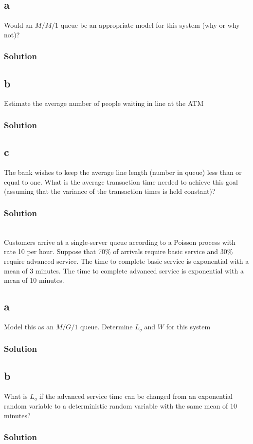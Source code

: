 \documentclass[letterpaper]{amsart}
\begin{document}
\subsection*{a}
Would an $M/M/1$ queue be an appropriate model for this system (why
or why not)?
\subsubsection*{Solution}
\subsection*{b}
Estimate the average number of people waiting in line at the ATM
\subsubsection*{Solution}
\subsection*{c}
The bank wishes to keep the average line length (number in queue) less
than or equal to one. What is the average transaction time needed to
achieve this goal (assuming that the variance of the transaction times is
held constant)?
\subsubsection*{Solution}

\section{} %
Customers arrive at a single-server queue according to a Poisson process with rate
10 per hour. Suppose that 70\% of arrivals require basic service and 30\% require
advanced service. The time to complete basic service is exponential with a mean
of 3 minutes. The time to complete advanced service is exponential with a mean
of 10 minutes.
\subsection*{a}
Model this as an $M/G/1$ queue. Determine $L_q$ and $W$ for this system
\subsubsection*{Solution}
\subsection*{b}
What is $L_q$ if the advanced service time can be changed from an
exponential random variable to a deterministic random variable with the
same mean of 10 minutes?
\subsubsection*{Solution}
\end{document}
